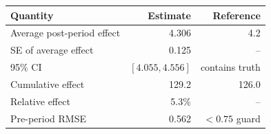 \begin{tabular}{lrr}
    \toprule
    Quantity & Estimate & Reference \\
    \midrule
    Average post-period effect & 4.306 & 4.2 \\
    SE of average effect & 0.125 & -- \\
    95\% CI & $[4.055, 4.556]$ & contains truth \\
    Cumulative effect & 129.2 & 126.0 \\
    Relative effect & 5.3\% & -- \\
    Pre-period RMSE & 0.562 & $<0.75$ guard \\
    \bottomrule
\end{tabular}
